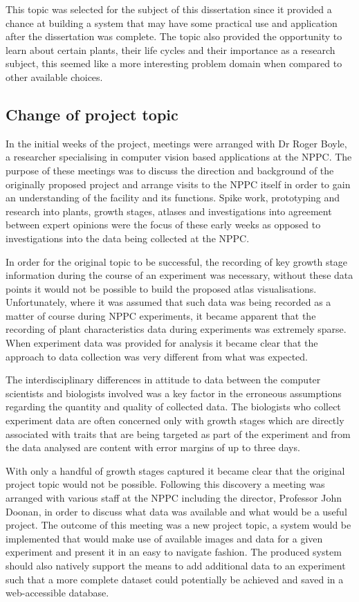 This topic was selected for the subject of this dissertation since it provided a chance at building a system that may have some practical use and application after the dissertation was complete. The topic also provided the opportunity to learn about certain plants, their life cycles and their importance as a research subject, this seemed like a more interesting problem domain when compared to other available choices.

\subsection{Change of project topic}\label{changeproj}

In the initial weeks of the project, meetings were arranged with Dr Roger Boyle, a researcher specialising in computer vision based applications at the NPPC. The purpose of these meetings was to discuss the direction and background of the originally proposed project and arrange visits to the NPPC itself in order to gain an understanding of the facility and its functions. Spike work, prototyping and research into plants, growth stages, atlases and investigations into agreement between expert opinions \cite{williams_comparing_1976} were the focus of these early weeks as opposed to investigations into the data being collected at the NPPC.

 In order for the original topic to be successful, the recording of key growth stage information during the course of an experiment was necessary, without these data points it would not be possible to build the proposed atlas visualisations. Unfortunately, where it was assumed that such data was being recorded as a matter of course during NPPC experiments, it became apparent that the recording of plant characteristics data during experiments was extremely sparse. When experiment data was provided for analysis it became clear that the approach to data collection was very different from what was expected. 
 
 The interdisciplinary differences in attitude to data between the computer scientists and biologists involved was a key factor in the erroneous assumptions regarding the quantity and quality of collected data. The biologists who collect experiment data are often concerned only with growth stages which are directly associated with traits that are being targeted as part of the experiment and from the data analysed are content with error margins of up to three days. 
 
 With only a handful of growth stages captured it became clear that the original project topic would not be possible. Following this discovery a meeting was arranged with various staff at the NPPC including the director, Professor John Doonan, in order to discuss what data was available and what would be a useful project. The outcome of this meeting was a new project topic, a system would be implemented that would make use of available images and data for a given experiment and present it in an easy to navigate fashion. The produced system should also natively support the means to add additional data to an experiment such that a more complete dataset could potentially be achieved and saved in a web-accessible database. 
 
